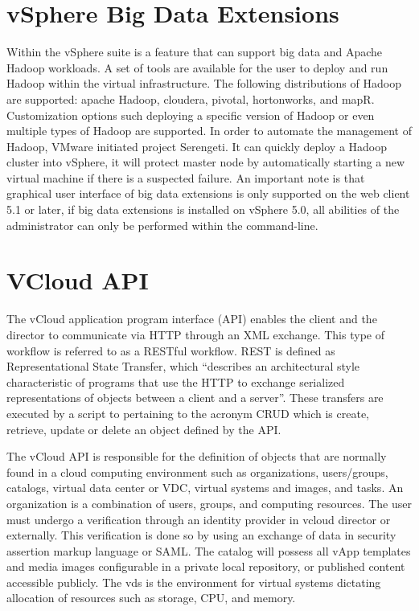\documentclass[9pt,twocolumn,twoside]{../../styles/osajnl}
\begin{document}
\section{vSphere Big Data Extensions}

Within the vSphere suite is a feature that can support big data and
Apache Hadoop workloads.  A set of tools are available for the user to
deploy and run Hadoop within the virtual infrastructure.  The
following distributions of Hadoop are supported: apache Hadoop,
cloudera, pivotal, hortonworks, and mapR.  Customization options such
deploying a specific version of Hadoop or even multiple types of
Hadoop are supported.  In order to automate the management of Hadoop,
VMware initiated project Serengeti.  It can quickly deploy a Hadoop
cluster into vSphere, it will protect master node by automatically
starting a new virtual machine if there is a suspected failure.  An
important note is that graphical user interface of big data extensions
is only supported on the web client 5.1 or later, if big data
extensions is installed on vSphere 5.0, all abilities of the
administrator can only be performed within the
command-line\cite{www-vmware2}.

\section{VCloud API}

The vCloud application program interface (API) enables the client and
the director to communicate via HTTP through an XML
exchange\cite{www-api}.  This type of workflow is referred to as a
RESTful workflow.  REST is defined as Representational State Transfer,
which ``describes an architectural style characteristic of programs
that use the HTTP to exchange serialized representations of objects
between a client and a server''\cite{www-api}.  These transfers are
executed by a script to pertaining to the acronym CRUD which is
create, retrieve, update or delete an object defined by the API.

The vCloud API is responsible for the definition of objects that are
normally found in a cloud computing environment such as organizations,
users/groups, catalogs, virtual data center or VDC, virtual systems
and images, and tasks\cite{www-api}.  An organization is a combination
of users, groups, and computing resources.  The user must undergo a
verification through an identity provider in vcloud director or
externally.  This verification is done so by using an exchange of data
in security assertion markup language or SAML.  The catalog will
possess all vApp templates and media images configurable in a private
local repository, or published content accessible publicly.  The vds
is the environment for virtual systems dictating allocation of
resources such as storage, CPU, and memory.
\end{document}
